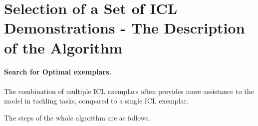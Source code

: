 \section{Selection of a Set of ICL Demonstrations - The Description of the Algorithm}
\label{appendix:dfs}

\paragraph{Search for Optimal exemplars.} The combination of multiple ICL exemplars often provides more assistance to the model in tackling tasks, compared to a single ICL exemplar.

The steps of the whole algorithm are as follows.

